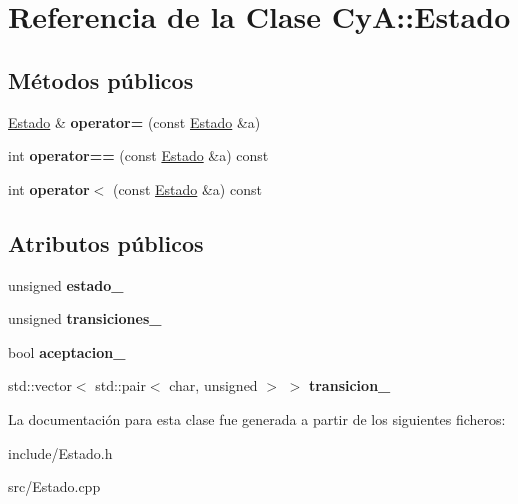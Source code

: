\hypertarget{class_cy_a_1_1_estado}{}\section{Referencia de la Clase CyA\+:\+:Estado}
\label{class_cy_a_1_1_estado}
\subsection*{Métodos públicos}
\begin{DoxyCompactItemize}
\item 
\mbox{\label{class_cy_a_1_1_estado_a32736601fb07796167fdc0b6821d2508}} 
\mbox{\hyperlink{class_cy_a_1_1_estado}{Estado}} \& {\bfseries operator=} (const \mbox{\hyperlink{class_cy_a_1_1_estado}{Estado}} \&a)
\item 
\mbox{\label{class_cy_a_1_1_estado_a35f9d60de08befa830c44f2b3e1fd3bc}} 
int {\bfseries operator==} (const \mbox{\hyperlink{class_cy_a_1_1_estado}{Estado}} \&a) const
\item 
\mbox{\label{class_cy_a_1_1_estado_a7ada3a4e88d3c27d66592eef790fdf46}} 
int {\bfseries operator$<$} (const \mbox{\hyperlink{class_cy_a_1_1_estado}{Estado}} \&a) const
\end{DoxyCompactItemize}
\subsection*{Atributos públicos}
\begin{DoxyCompactItemize}
\item 
\mbox{\label{class_cy_a_1_1_estado_a302d42b269605feb9ab837d4c952d871}} 
unsigned {\bfseries estado\+\_\+}
\item 
\mbox{\label{class_cy_a_1_1_estado_ae74acdff6c33550ac3235295d5070b91}} 
unsigned {\bfseries transiciones\+\_\+}
\item 
\mbox{\label{class_cy_a_1_1_estado_a7952d333fb3611d3abcf605d8ed0177a}} 
bool {\bfseries aceptacion\+\_\+}
\item 
\mbox{\label{class_cy_a_1_1_estado_a8eea41e8dba3f84a191d3a4a6a120006}} 
std\+::vector$<$ std\+::pair$<$ char, unsigned $>$ $>$ {\bfseries transicion\+\_\+}
\end{DoxyCompactItemize}


La documentación para esta clase fue generada a partir de los siguientes ficheros\+:\begin{DoxyCompactItemize}
\item 
include/Estado.\+h\item 
src/Estado.\+cpp\end{DoxyCompactItemize}
